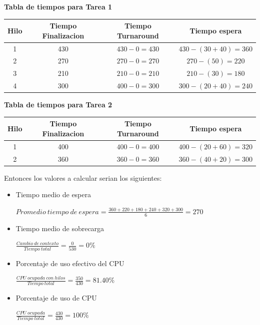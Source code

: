 \documentclass{article}
\begin{document}
\begin{center} \textbf{Tabla de tiempos para Tarea 1}
	\newline
	\newline
	\begin{tabular}{||c c c c||} 
	 \hline
	 Hilo & Tiempo Finalizacion & Tiempo Turnaround & Tiempo espera \\ [0.5ex] 
	 \hline\hline
	 1 & 430 & $430 - 0 = 430$ & $430 - (30 + 40) = 360$  \\ 
	 \hline
	 2 & 270 & $270 - 0 = 270$ & $270 - (50) = 220$ \\
	 \hline
	 3 & 210 & $210 - 0 = 210$  & $210 - (30) = 180$ \\
	 \hline
	 4 & 300 & $400 - 0 = 300$ & $300 - (20 + 40) = 240$ \\
	 \hline
	\end{tabular}
\end{center}

\begin{center} \textbf{Tabla de tiempos para Tarea 2}
	\newline
	\newline
	\begin{tabular}{||c c c c||} 
	 \hline
	 Hilo & Tiempo Finalizacion & Tiempo Turnaround & Tiempo espera \\ [0.5ex] 
	 \hline\hline
	 1 & 400 & $400 - 0 = 400$ & $400 - (20 + 60) = 320$  \\ 
	 \hline
	 2 & 360 & $360 - 0 = 360$ & $360 - (40 + 20) = 300$ \\
	\end{tabular}
\end{center}

Entonces los valores a calcular serian los siguientes:
\begin{itemize}
	\item Tiempo medio de espera	
	\begin{center}
		$ Promedio\  tiempo\  de\  espera = \frac{360 + 220 + 180 + 240 + 320 + 300}{6} = 270 $
	\end{center}
	\item Tiempo medio de sobrecarga
	\begin{center}
		$ \frac{Cambio\  de\  contexto}{Tiempo\  total} = \frac{0}{530} = 0\% $
	\end{center}		
	\item Porcentaje de uso efectivo del CPU
	\begin{center}
		$ \frac{CPU \  ocupada\  con\  hilos}{Tiempo\  total} = \frac{350}{430} = 81.40\% $
	\end{center}
	\item Porcentaje de uso de CPU
	\begin{center}
		$ \frac{CPU \  ocupada}{Tiempo\  total} = \frac{430}{430} = 100\% $
	\end{center}
\end{itemize}
\end{document}
